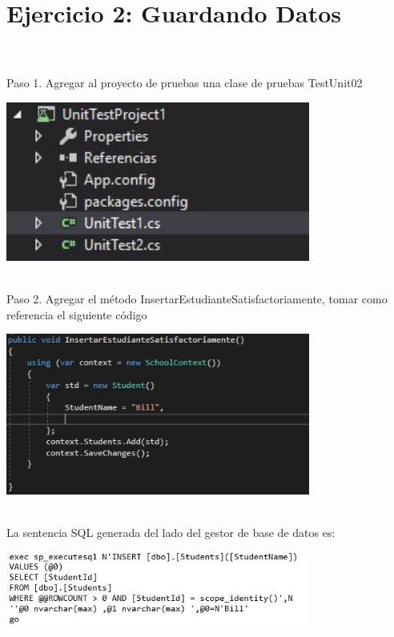 \section{Ejercicio 2: Guardando Datos} 

\textbf{}\\
\textbf{}\\
Paso 1. Agregar al proyecto de pruebas una clase de pruebas TestUnit02

\begin{center}
	\includegraphics[width=10cm]{./Imagenes/Captura8} 
	\end{center}
\textbf{}\\

Paso 2. Agregar el método InsertarEstudianteSatisfactoriamente, tomar como referencia el siguiente código
\begin{center}
	\includegraphics[width=10cm]{./Imagenes/Captura9} 
	\end{center}

\textbf{}\\
La sentencia SQL generada del lado del gestor de base de datos es:
\begin{center}
	\includegraphics[width=10cm]{./Imagenes/U1-7} 
	\end{center}

